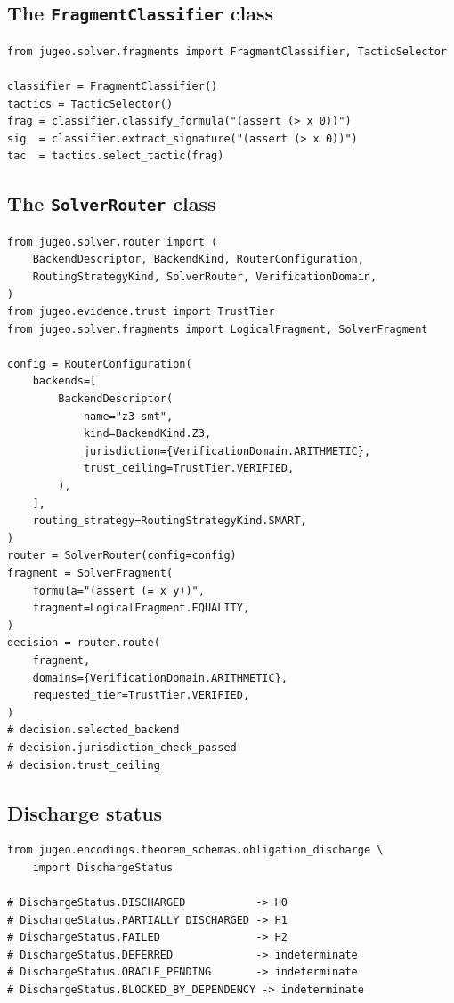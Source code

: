 \documentclass[11pt]{article}
\begin{document}
\subsection{The \texttt{FragmentClassifier} class}

\begin{lstlisting}[caption={FragmentClassifier usage.},
                   label=lst:classifier]
from jugeo.solver.fragments import FragmentClassifier, TacticSelector

classifier = FragmentClassifier()
tactics = TacticSelector()
frag = classifier.classify_formula("(assert (> x 0))")
sig  = classifier.extract_signature("(assert (> x 0))")
tac  = tactics.select_tactic(frag)
\end{lstlisting}

\subsection{The \texttt{SolverRouter} class}

\begin{lstlisting}[caption={SolverRouter usage.},label=lst:router-api]
from jugeo.solver.router import (
    BackendDescriptor, BackendKind, RouterConfiguration,
    RoutingStrategyKind, SolverRouter, VerificationDomain,
)
from jugeo.evidence.trust import TrustTier
from jugeo.solver.fragments import LogicalFragment, SolverFragment

config = RouterConfiguration(
    backends=[
        BackendDescriptor(
            name="z3-smt",
            kind=BackendKind.Z3,
            jurisdiction={VerificationDomain.ARITHMETIC},
            trust_ceiling=TrustTier.VERIFIED,
        ),
    ],
    routing_strategy=RoutingStrategyKind.SMART,
)
router = SolverRouter(config=config)
fragment = SolverFragment(
    formula="(assert (= x y))",
    fragment=LogicalFragment.EQUALITY,
)
decision = router.route(
    fragment,
    domains={VerificationDomain.ARITHMETIC},
    requested_tier=TrustTier.VERIFIED,
)
# decision.selected_backend
# decision.jurisdiction_check_passed
# decision.trust_ceiling
\end{lstlisting}

\subsection{Discharge status}

\begin{lstlisting}[caption={DischargeStatus enum.},label=lst:discharge]
from jugeo.encodings.theorem_schemas.obligation_discharge \
    import DischargeStatus

# DischargeStatus.DISCHARGED           -> H0
# DischargeStatus.PARTIALLY_DISCHARGED -> H1
# DischargeStatus.FAILED               -> H2
# DischargeStatus.DEFERRED             -> indeterminate
# DischargeStatus.ORACLE_PENDING       -> indeterminate
# DischargeStatus.BLOCKED_BY_DEPENDENCY -> indeterminate
\end{lstlisting}
\end{document}
